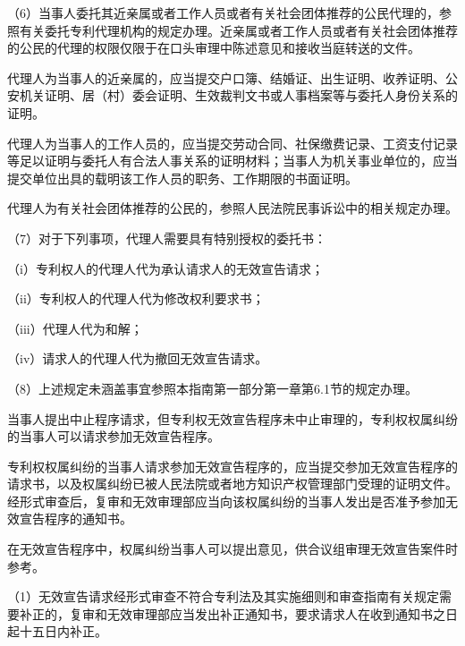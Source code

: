 {\setlength{\parindent}{17.1bp}（6）当事人委托其近亲属或者工作人员或者有关社会团体推荐的公民代理的，参照有关委托专利代理机构的规定办理。近亲属或者工作人员或者有关社会团体推荐的公民的代理的权限仅限于在口头审理中陈述意见和接收当庭转送的文件。\par}

代理人为当事人的近亲属的，应当提交户口簿、结婚证、出生证明、收养证明、公安机关证明、居（村）委会证明、生效裁判文书或人事档案等与委托人身份关系的证明。

代理人为当事人的工作人员的，应当提交劳动合同、社保缴费记录、工资支付记录等足以证明与委托人有合法人事关系的证明材料；当事人为机关事业单位的，应当提交单位出具的载明该工作人员的职务、工作期限的书面证明。

代理人为有关社会团体推荐的公民的，参照人民法院民事诉讼中的相关规定办理。

{\setlength{\parindent}{17.1bp}（7）对于下列事项，代理人需要具有特别授权的委托书：\par}

{\setlength{\parindent}{17.1bp}（i）专利权人的代理人代为承认请求人的无效宣告请求；\par}

{\setlength{\parindent}{17.1bp}（ii）专利权人的代理人代为修改权利要求书；\par}

{\setlength{\parindent}{17.1bp}（iii）代理人代为和解；\par}

{\setlength{\parindent}{17.1bp}（iv）请求人的代理人代为撤回无效宣告请求。\par}

{\setlength{\parindent}{17.1bp}（8）上述规定未涵盖事宜参照本指南第一部分第一章第6.1节的规定办理。\par}

{\setlength{\parindent}{22.7bp}当事人提出中止程序请求，但专利权无效宣告程序未中止审理的，专利权权属纠纷的当事人可以请求参加无效宣告程序。\par}

专利权权属纠纷的当事人请求参加无效宣告程序的，应当提交参加无效宣告程序的请求书，以及权属纠纷已被人民法院或者地方知识产权管理部门受理的证明文件。经形式审查后，复审和无效审理部应当向该权属纠纷的当事人发出是否准予参加无效宣告程序的通知书。

在无效宣告程序中，权属纠纷当事人可以提出意见，供合议组审理无效宣告案件时参考。

{\setlength{\parindent}{17.1bp}（1）无效宣告请求经形式审查不符合专利法及其实施细则和审查指南有关规定需要补正的，复审和无效审理部应当发出补正通知书，要求请求人在收到通知书之日起十五日内补正。\par}

